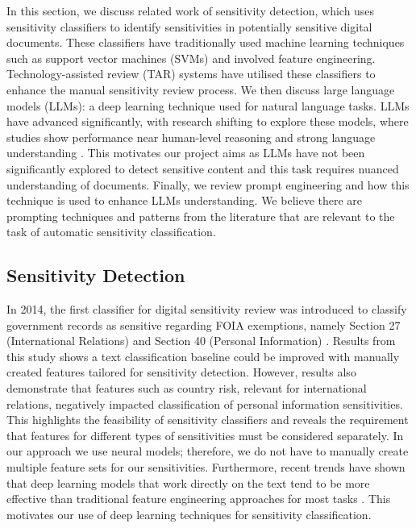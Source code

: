 \label{sec:background}
In this section, we discuss related work of sensitivity detection, which uses sensitivity classifiers to identify sensitivities in potentially sensitive digital documents. These classifiers have traditionally used machine learning techniques such as support vector machines (SVMs) and involved feature engineering. Technology-assisted review (TAR) systems have utilised these classifiers to enhance the manual sensitivity review process. We then discuss large language models (LLMs): a deep learning technique used for natural language tasks. LLMs have advanced significantly, with research shifting to explore these models, where studies show performance near human-level reasoning and strong language understanding \cite{openai2023gpt}. This motivates our project aims as LLMs have not been significantly explored to detect sensitive content and this task requires nuanced understanding of documents. Finally, we review prompt engineering and how this technique is used to enhance LLMs understanding. We believe there are prompting techniques and patterns from the literature that are relevant to the task of automatic sensitivity classification.

\subsection{Sensitivity Detection}
\label{sec:background:sensitivity_detection}
In 2014, the first classifier for digital sensitivity review was introduced to classify government records as sensitive regarding FOIA exemptions, namely Section 27 (International Relations) and Section 40 (Personal Information) \cite{mcdonald2014towards}. Results from this study shows a text classification baseline could be improved with manually created features tailored for sensitivity detection. However, results also demonstrate that features such as country risk, relevant for international relations, negatively impacted classification of personal information sensitivities. This highlights the feasibility of sensitivity classifiers and reveals the requirement that features for different types of sensitivities must be considered separately. In our approach we use neural models; therefore, we do not have to manually create multiple feature sets for our sensitivities. Furthermore, recent trends have shown that deep learning models that work directly on the text tend to be more effective than traditional feature engineering approaches for most tasks \cite{otter2020survey}. This motivates our use of deep learning techniques for sensitivity classification.

